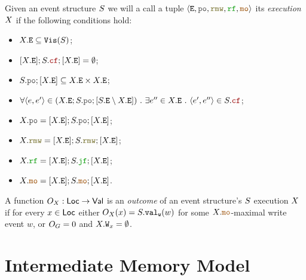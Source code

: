 \documentclass[12pt]{article}
\begin{document}
\begin{definition}
  Given an event structure $S$ we will a call a tuple $\tup{\lE, \lPO, \lRMW, \lRF, \lMO}$ 
  its \emph{execution} $X$ if the following conditions hold:
  \begin{itemize}
    \item $X.{\mathtt{E}} \subseteq {\mathtt{Vis}}(S)$;
    \item $[\lX.\lE];\lES.\lCF;[\lX.\lE] = \emptyset$;
    \item $\lES.\lPO;[\lX.\lE] \subseteq \lX.\lE \times \lX.\lE$;
    \item $\forall{\tup{e, e'}} \in (\lX.\lE;\lES.\lPO;[\lES.\lE \setminus \lX.\lE]) ~.~ 
      \exists{e''} \in \lX.\lE ~.~ \tup{e', e''} \in \lES.\lCF$;
    \item $\lX.\lPO = [\lX.\lE];\lES.\lPO;[\lX.\lE]$;
    \item $\lX.\lRMW = [\lX.\lE];\lES.\lRMW;[\lX.\lE]$;
    \item $\lX.\lRF = [\lX.\lE];\lES.\lJF;[\lX.\lE]$;
    \item $\lX.\lMO = [\lX.\lE];\lES.\lMO;[\lX.\lE]$.
  \end{itemize}
\end{definition}

\begin{definition}
  A function $O_{X} : \mathsf{Loc} \rightarrow \mathsf{Val}$ is an \emph{outcome} 
  of an event structure's $S$ execution $X$
  if for every $x \in \mathsf{Loc}$ either $O_{X}(x) = S.{\mathtt{val_w}}(w)$ 
  for some $\lX.\lMO$-maximal write event $w$, 
  or $O_{G} = 0$ and $X.{\mathtt{W}}_x = \emptyset$.
\end{definition}

\section{Intermediate Memory Model}
\end{document}
